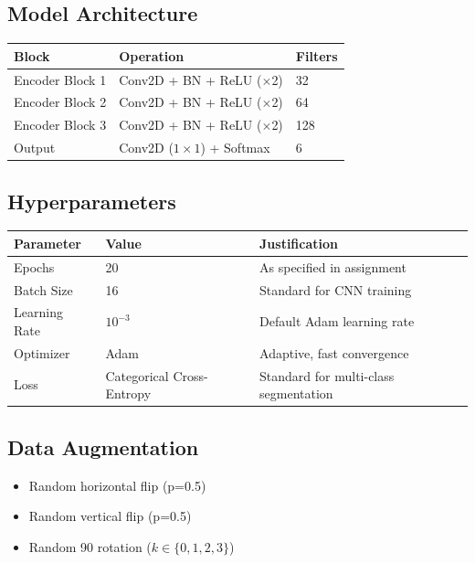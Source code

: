 \documentclass[12pt,a4paper]{article}
\begin{document}
\subsection{Model Architecture}

\begin{center}
\begin{tabular}{l l l}
\toprule
\textbf{Block} & \textbf{Operation} & \textbf{Filters} \\
\midrule
Encoder Block 1 & Conv2D + BN + ReLU ($\times$2) & 32  \\
Encoder Block 2 & Conv2D + BN + ReLU ($\times$2) & 64  \\
Encoder Block 3 & Conv2D + BN + ReLU ($\times$2) & 128 \\
Output          & Conv2D ($1\times1$) + Softmax   & 6 \\
\bottomrule
\end{tabular}
\end{center}

\subsection{Hyperparameters}

\begin{center}
\begin{tabular}{l l l}
\toprule
\textbf{Parameter} & \textbf{Value} & \textbf{Justification} \\
\midrule
Epochs         & 20      & As specified in assignment \\
Batch Size     & 16      & Standard for CNN training \\
Learning Rate  & $10^{-3}$ & Default Adam learning rate \\
Optimizer      & Adam    & Adaptive, fast convergence \\
Loss           & Categorical Cross-Entropy & Standard for multi-class segmentation \\
\bottomrule
\end{tabular}
\end{center}

\subsection{Data Augmentation}
\begin{itemize}
    \item[\checkmark] Random horizontal flip (p=0.5)
    \item[\checkmark] Random vertical flip (p=0.5)
    \item[\checkmark] Random 90\textdegree{} rotation ($k \in \{0,1,2,3\}$)
\end{itemize}
\end{document}

